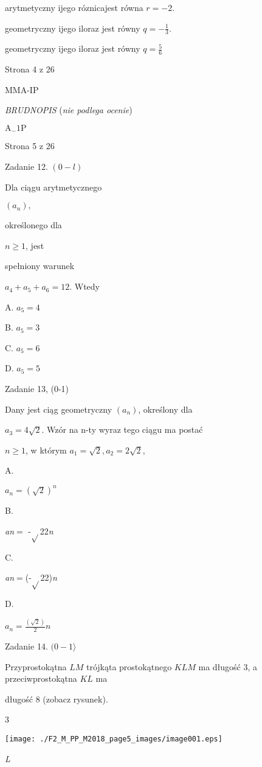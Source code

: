 \documentclass[a4paper,12pt]{article}
\begin{document}
arytmetyczny ijego róznicajest równa $r=-2.$

geometryczny ijego iloraz jest równy $q=-\displaystyle \frac{1}{3}.$

geometryczny ijego iloraz jest równy $q=\displaystyle \frac{5}{6}$

Strona 4 z 26

MMA-IP





{\it BRUDNOPIS} ({\it nie podlega ocenie})

$\mathrm{A}_{-}1\mathrm{P}$

Strona 5 z 26





Zadanie 12. $(0-l)$

Dla ciągu arytmetycznego

$(a_{n}),$

określonego dla

$n\geq 1$, jest

spełniony warunek

$a_{4}+a_{5}+a_{6}=12$. Wtedy

A. $a_{5}=4$

B. $a_{5}=3$

C. $a_{5}=6$

D. $a_{5}=5$

Zadanie 13, (0-1)

Dany jest ciąg geometryczny $(a_{n})$, określony dla

$a_{3}=4\sqrt{2}$. Wzór na n-ty wyraz tego ciągu ma postać

$n\geq 1$, w którym $a_{1}=\sqrt{2}, a_{2}=2\sqrt{2},$

A.

$a_{n}=(\sqrt{2})^{n}$

B.

{\it an}$=$ -$\sqrt{}$22{\it n}

C.

{\it an}$=$(-$\sqrt{}$22){\it n}

D.

$a_{n}=\displaystyle \frac{(\sqrt{2})}{2}n$

Zadanie 14. $(0-1\rangle$

Przyprostokątna $LM$ trójkąta prostokątnego $KLM$ ma długość 3, a przeciwprostokątna $KL$ ma

długość 8 (zobacz rysunek).

3
\begin{center}
\texttt{[image: ./F2\_M\_PP\_M2018\_page5\_images/image001.eps]}
\end{center}
{\it L}
\end{document}
